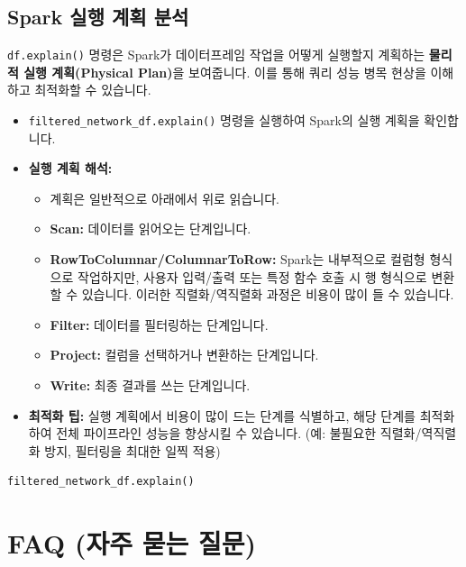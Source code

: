 \documentclass[11pt,a4paper]{article}
\theoremstyle{definition}
\begin{document}
\subsection{Spark 실행 계획 분석}

\begin{conceptbox}
\texttt{df.explain()} 명령은 Spark가 데이터프레임 작업을 어떻게 실행할지 계획하는 \textbf{물리적 실행 계획(Physical Plan)}을 보여줍니다. 이를 통해 쿼리 성능 병목 현상을 이해하고 최적화할 수 있습니다.
\end{conceptbox}

\begin{itemize}
    \item \texttt{filtered_network_df.explain()} 명령을 실행하여 Spark의 실행 계획을 확인합니다.
    \item \textbf{실행 계획 해석:}
    \begin{itemize}
        \item 계획은 일반적으로 아래에서 위로 읽습니다.
        \item \textbf{Scan:} 데이터를 읽어오는 단계입니다.
        \item \textbf{RowToColumnar/ColumnarToRow:} Spark는 내부적으로 컬럼형 형식으로 작업하지만, 사용자 입력/출력 또는 특정 함수 호출 시 행 형식으로 변환할 수 있습니다. 이러한 직렬화/역직렬화 과정은 비용이 많이 들 수 있습니다.
        \item \textbf{Filter:} 데이터를 필터링하는 단계입니다.
        \item \textbf{Project:} 컬럼을 선택하거나 변환하는 단계입니다.
        \item \textbf{Write:} 최종 결과를 쓰는 단계입니다.
    \end{itemize}
    \item \textbf{최적화 팁:} 실행 계획에서 비용이 많이 드는 단계를 식별하고, 해당 단계를 최적화하여 전체 파이프라인 성능을 향상시킬 수 있습니다. (예: 불필요한 직렬화/역직렬화 방지, 필터링을 최대한 일찍 적용)
\end{itemize}

\begin{lstlisting}[label={lst:spark_explain}]
filtered_network_df.explain()
\end{lstlisting}

\newpage
\section{FAQ (자주 묻는 질문)}
\end{document}
